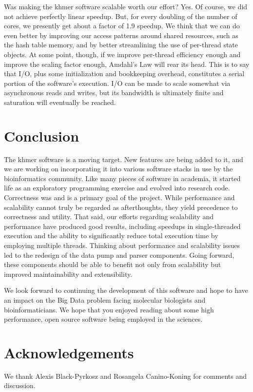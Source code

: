 \documentclass{article}
\begin{document}
Was making the khmer software scalable worth our effort? Yes. Of course, we did
not achieve perfectly linear speedup. But, for every doubling of the number of
cores, we presently get about a factor of 1.9 speedup. We think that we can do
even better by improving our access patterns around shared resources, such as
the hash table memory, and by better streamlining the use of per-thread state
objects. At some point, though, if we improve per-thread efficiency enough and
improve the scaling factor enough, Amdahl's Law \citep{web:Amdahl} will rear
its head. This is to say that I/O, plus some initialization and bookkeeping
overhead, constitutes a serial portion of the software's execution. I/O can be
made to scale somewhat via asynchronous reads and writes, but its bandwidth is
ultimately finite and saturation will eventually be reached.


\section{Conclusion}

The khmer software is a moving target. New features are being added to it, and
we are working on incorporating it into various software stacks in use by the
bioinformatics community. Like many pieces of software in academia, it started
life as an exploratory programming exercise and evolved into research code.
Correctness was and is a primary goal of the project. While performance and
scalability cannot truly be regarded as afterthoughts, they yield precedence to
correctness and utility. That said, our efforts regarding scalability and
performance have produced good results, including speedups in single-threaded
execution and the ability to significantly reduce total execution time by
employing multiple threads. Thinking about performance and scalability issues
led to the redesign of the data pump and parser components. Going forward,
these components should be able to benefit not only from scalability but
improved maintainability and extensibility.

We look forward to continuing the development of this software and hope to have
an impact on the Big Data problem facing molecular biologists and
bioinformaticians. We hope that you enjoyed reading about some high
performance, open source software being employed in the sciences.

\section{Acknowledgements}

We thank Alexis Black-Pyrkosz and Rosangela Canino-Koning for comments and
discussion.



\end{document}
